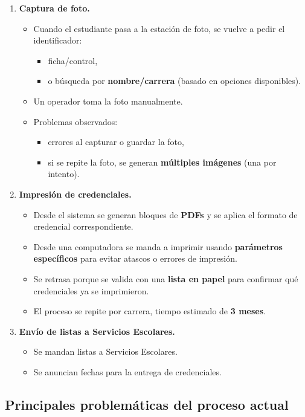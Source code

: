 \documentclass[12pt,a4paper]{article}
\begin{document}
\begin{enumerate}[leftmargin=*, label=\textbf{\arabic*.}]
  \item \textbf{Captura de foto.}
  \begin{itemize}
    \item Cuando el estudiante pasa a la estación de foto, se vuelve a pedir el identificador:
    \begin{itemize}
      \item ficha/control,
      \item o búsqueda por \textbf{nombre/carrera} (basado en opciones disponibles).
    \end{itemize}
    \item Un operador toma la foto manualmente.
    \item Problemas observados:
    \begin{itemize}
      \item errores al capturar o guardar la foto,
      \item si se repite la foto, se generan \textbf{múltiples imágenes} (una por intento).
    \end{itemize}
  \end{itemize}

  \item \textbf{Impresión de credenciales.}
  \begin{itemize}
    \item Desde el sistema se generan bloques de  \textbf{PDFs} y se aplica el formato de credencial correspondiente.
    \item Desde una computadora se manda a imprimir usando \textbf{parámetros específicos} para evitar atascos o errores de impresión.
    \item Se retrasa porque se valida con una \textbf{lista en papel} para confirmar qué credenciales ya se imprimieron.
    \item El proceso se repite por carrera, tiempo estimado de \textbf{3 meses}.
  \end{itemize}

  \item \textbf{Envío de listas a Servicios Escolares.}
  \begin{itemize}
    \item Se mandan listas a Servicios Escolares.
    \item Se anuncian fechas para la entrega de credenciales.
  \end{itemize}
\end{enumerate}

\subsection{Principales problemáticas del proceso actual}
\end{document}
